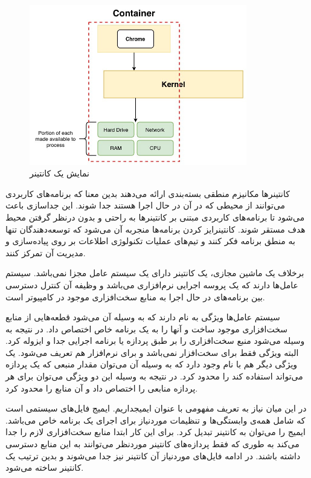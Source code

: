 \begin{figure}[!h]
	\centering
	\includegraphics[height=7cm]{images/container}
	\caption{نمایش یک کانتینر}
	\label{container}
\end{figure}

کانتینرها مکانیزم منطقی بسته‌بندی ارائه می‌دهند بدین معنا که برنامه‌های کاربردی می‌توانند از محیطی که در آن در حال اجرا هستند جدا شوند. این جداسازی باعث می‌شود تا برنامه‌های کاربردی مبتنی بر کانتینرها به راحتی و بدون درنظر گرفتن محیط هدف مستقر شوند. کانتینرایز کردن برنامه‌ها منجربه آن می‌شود که توسعه‌دهندگان تنها به منطق برنامه فکر کنند و تیم‌های عملیات تکنولوژی اطلاعات بر روی پیاده‌سازی و مدیریت آن تمرکز کنند.

برخلاف یک ماشین مجازی، یک کانتینر دارای یک سیستم عامل مجزا نمی‌باشد. سیستم عامل‌ها
دارند که یک پروسه اجرایی نرم‌افزاری می‌باشد و وظیفه آن کنترل دسترسی بین برنامه‌های در حال اجرا به منابع سخت‌افزاری موجود در کامپیوتر است.

سیستم عامل‌ها ویژگی به نام
دارند که به وسیله آن می‌شود قطعه‌هایی از منابع سخت‌افزاری موجود ساخت و آنها را به یک برنامه خاص اختصاص داد. در نتیجه به وسیله
می‌شود منبع سخت‌افزاری را بر طبق  پردازه یا برنامه اجرایی جدا و ایزوله کرد. البته ویژگی
فقط برای سخت‌افزار نمی‌باشد و برای نرم‌افزار هم تعریف می‌شود. یک ویژگی دیگر هم با نام
وجود دارد که به وسیله آن می‌توان مقدار منبعی که یک پردازه می‌تواند استفاده کند را محدود کرد. در نتیجه به وسیله این دو ویژگی می‌توان برای هر پردازه منابعی را اختصاص داد و آن منابع را محدود کرد. 

در این میان نیاز به تعریف مفهومی با عنوان ایمیجداریم. ایمیج فایل‌های سیستمی است که شامل همه‌ی وابستگی‌ها و تنظیمات موردنیاز برای اجرای یک برنامه خاص می‌باشد. ایمیج را می‌توان به کانتینر تبدیل کرد. برای این کار ابتدا
منابع سخت‌افزاری لازم را جدا می‌کند به طوری که فقط پردازه‌های کانتینر موردنظر می‌توانند به این منابع دسترسی داشته باشند. در ادامه فایل‌های موردنیاز آن کانتینر نیز جدا می‌شوند و بدین ترتیب یک کانتینر ساخته می‌شود.


